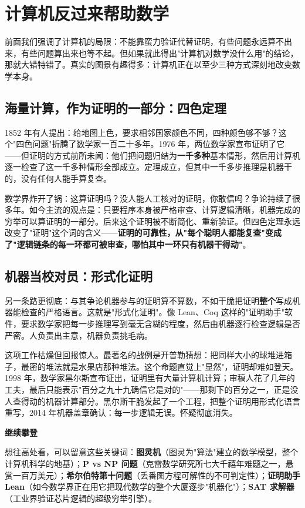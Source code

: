 \section{计算机反过来帮助数学}

前面我们强调了计算机的局限：不能靠蛮力验证代替证明，有些问题永远算不出来，有些问题算出来也等不起。但如果就此得出"计算机对数学没什么用"的结论，那就大错特错了。真实的图景有趣得多：计算机正在以至少三种方式深刻地改变数学本身。

\subsection{海量计算，作为证明的一部分：四色定理}

1852 年有人提出：给地图上色，要求相邻国家颜色不同，四种颜色够不够？这个"四色问题"折腾了数学家一百二十多年。1976 年，两位数学家宣布证明了它——但证明的方式前所未闻：他们把问题归结为\textbf{一千多种}基本情形，然后用计算机逐一检查了这一千多种情形全部成立。定理成立，但其中一千多步推理是机器干的，没有任何人能手算复查。

数学界炸开了锅：这算证明吗？没人能人工核对的证明，你敢信吗？争论持续了很多年。如今主流的观点是：只要程序本身被严格审查、计算逻辑清晰，机器完成的穷举可以算证明的一部分。后来这个证明被不断简化、重新验证。但四色定理永远改变了"证明"这个词的含义——\textbf{证明的可靠性，从"每个聪明人都能复查"变成了"逻辑链条的每一环都可被审查，哪怕其中一环只有机器干得动"}。

\subsection{机器当校对员：形式化证明}

另一条路更彻底：与其争论机器参与的证明算不算数，不如干脆把证明\textbf{整个}写成机器能检查的严格语言。这就是"形式化证明"。像 Lean、Coq 这样的"证明助手"软件，要求数学家把每一步推理写到毫无含糊的程度，然后由机器逐行检查逻辑是否严密。人负责出主意，机器负责挑毛病。

这项工作枯燥但回报惊人。最著名的战例是开普勒猜想：把同样大小的球堆进箱子，最密的堆法就是水果店那种堆法。这个命题直觉上"显然"，证明却难如登天。1998 年，数学家黑尔斯宣布证出，证明里有大量计算机计算；审稿人花了几年的工夫，最后只能表示"百分之九十九确信它是对的"——那剩下的百分之一，正是没人查得动的机器计算部分。黑尔斯干脆发起了一个工程，把整个证明用形式化语言重写，2014 年机器盖章确认：每一步逻辑无误。怀疑彻底消失。

\begin{pandeng}
\textbf{继续攀登}

想往高处看，可以留意这些关键词：\textbf{图灵机}（图灵为"算法"建立的数学模型，整个计算机科学的地基）；\textbf{P vs NP 问题}（克雷数学研究所七大千禧年难题之一，悬赏一百万美元）；\textbf{希尔伯特第十问题}（丢番图方程可解性的不可判定性）；\textbf{证明助手 Lean}（如今数学界正在用它把现代数学的整个大厦逐步"机器化"）；\textbf{SAT 求解器}（工业界验证芯片逻辑的超级穷举引擎）。
\end{pandeng}


